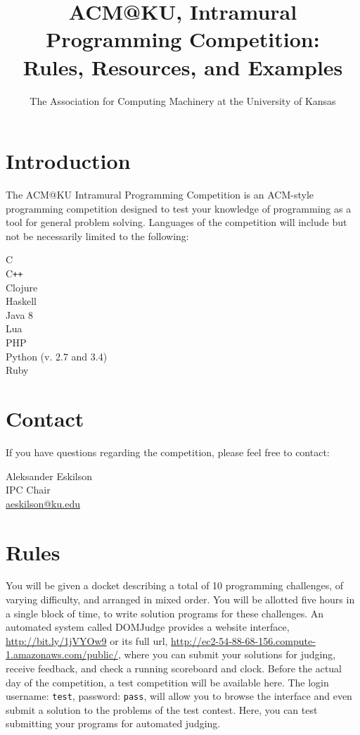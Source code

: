 \documentclass[a4paper]{article}
\title{ACM@KU, Intramural Programming Competition: \\ 
Rules, Resources, and Examples}
\date{\compDate}
\author{The Association for Computing Machinery at the University of Kansas}
\makeatletter
\def \competitionChairName {Aleksander Eskilson}
\def \competitionChairEmail {aeskilson@ku.edu}
\def \DOMJudgeURLShort {http://bit.ly/1jVYOw9}
\def \DOMJudgeURLLong {http://ec2-54-88-68-156.compute-1.amazonaws.com/public/}
\makeatother
\begin{document}
\maketitle

\tableofcontents

\newpage

\section{Introduction}

The ACM@KU Intramural Programming Competition is an ACM-style programming competition designed to test your knowledge of programming as a tool for general problem solving. Languages of the competition will include but not be necessarily limited to the following:
\begin{center}
    C \\
    C\texttt{++} \\
    Clojure \\
    Haskell \\
    Java 8 \\ 
    Lua \\
    PHP \\
    Python (v. 2.7 and 3.4) \\
    Ruby \\
\end{center}

\newpage

\section{Contact}

If you have questions regarding the competition, please feel free to contact:
\begin{center}
    \competitionChairName \\
    IPC Chair \\
    \url{\competitionChairEmail} \\
\end{center}

\newpage

\section{Rules}

You will be given a docket describing a total of 10 programming challenges, of varying difficulty, and arranged in mixed order. You will be allotted five hours in a single block of time, to write solution programs for these challenges. An automated system called DOMJudge provides a website interface, \url{\DOMJudgeURLShort} or its full url, \url{\DOMJudgeURLLong}, where you can submit your solutions for judging, receive feedback, and check a running scoreboard and clock. Before the actual day of the competition, a test competition will be available here. The login username: \texttt{test}, password: \texttt{pass}, will allow you to browse the interface and even submit a solution to the problems of the test contest. Here, you can test submitting your programs for automated judging. 
\end{document}
